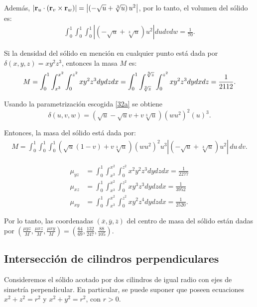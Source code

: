 Además, $\left| {\bf r}_{u}\cdot \left( {\bf r}_{v}\times {\bf r}_{w}\right) \right| = \left| \left( -\sqrt{u}+\sqrt[3]{u}\right) u^{2}\right|$, por lo tanto, el volumen del sólido es:
\begin{align*}
\int_{0}^{1}\int_{0}^{1}\int_{0}^{1}\left|\left(-\sqrt{u}+\sqrt[3]{u}\right) u^{2}\right|dudvdw= \frac{1}{70}.
\end{align*}

Si la densidad del sólido en mención en cualquier punto está dada por
$\delta \left( x,y,z\right) =xy^{2}z^{3}$, entonces la masa $M$ es:
\[M= \displaystyle \int_{0}^{1}\int_{x^{3}}^{x^{2}}\int_{0}^{z^{2}}xy^{2}z^{3}dydzdx=
\displaystyle \int_{0}^{1}\int_{\sqrt[2]{z}}^{\sqrt[3]{z}}\int_{0}^{z^{2}}xy^{2}z^{3}dydxdz= \frac{1}{2112}.\]

Usando la parametrización escogida \ref{32a} se obtiene
\[\delta \left( u,v,w\right) =\left( \sqrt{u}-\sqrt{u}v+v\sqrt[3]{u}\right) \left( wu^{2}\right) ^{2}\left( u\right) ^{3}.\]

Entonces, la masa del sólido está dada por:
\begin{gather*}
M=\int_{0}^{1}\int_{0}^{1}\int_{0}^{1} \left( \sqrt{u}(1-v)+v\sqrt[3]{u} \right) \left( wu^{2}\right) ^{2}u ^3 \left|\left( -\sqrt{u}+\sqrt[3]{u}\right) u^{2}\right| \,du\,dv.
\end{gather*}

\begin{align*}
\mu_{yz} &= \int_0^1\int_{x^3}^{x^2}\int_0^{z^2}x^2 y^2 z^3 dydzdx =\frac{1}{2277} \\
\mu_{xz} &= \int_0^1\int_{x^3}^{x^2}\int_0^{z^2}x y^3 z^3 dydzdx =\frac{1}{3952} \\
\mu_{xy} &= \int_0^1\int_{x^3}^{x^2}\int_0^{z^2}x y^2 z^4 dydzdx=\frac{1}{2520}.
\end{align*}

Por lo tanto, las coordenadas $(\overline{x},\overline{y},\overline{z})$ del centro de masa del sólido están dadas por
$\left(\frac{\mu{yz}}{M}, \frac{\mu{xz}}{M},\frac{\mu{xy}}{M}\right)=\left(\frac{64}{69}, \frac{132}{247},\frac{88}{105}\right)$.

\subsection{Intersección de cilindros perpendiculares}
Consideremos el sólido acotado por dos cilindros de igual radio con ejes de simetría perpendicular. En particular, se puede suponer que poseen ecuaciones $x^{2}+z^{2}=r^{2}$ y $x^{2}+y^{2}=r^{2}$, con $r>0$.

